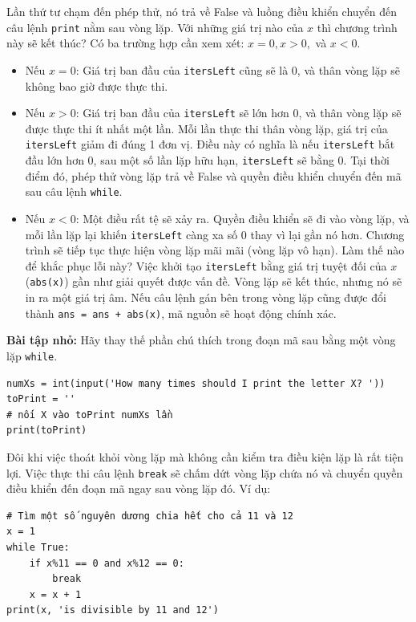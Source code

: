 Lần thứ tư chạm đến phép thử, nó trả về False và luồng điều khiển chuyển đến câu lệnh \texttt{print} nằm sau vòng lặp. Với những giá trị nào của $x$ thì chương trình này sẽ kết thúc? Có ba trường hợp cần xem xét: $x = 0, x > 0,$ và $x < 0$.

\begin{itemize}
    \item Nếu $x = 0$: Giá trị ban đầu của \texttt{itersLeft} cũng sẽ là 0, và thân vòng lặp sẽ không bao giờ được thực thi.
    
    \item Nếu $x > 0$: Giá trị ban đầu của \texttt{itersLeft} sẽ lớn hơn 0, và thân vòng lặp sẽ được thực thi ít nhất một lần. Mỗi lần thực thi thân vòng lặp, giá trị của \texttt{itersLeft} giảm đi đúng 1 đơn vị. Điều này có nghĩa là nếu \texttt{itersLeft} bắt đầu lớn hơn 0, sau một số lần lặp hữu hạn, \texttt{itersLeft} sẽ bằng 0. Tại thời điểm đó, phép thử vòng lặp trả về False và quyền điều khiển chuyển đến mã sau câu lệnh \texttt{while}.
    
    \item Nếu $x < 0$: Một điều rất tệ sẽ xảy ra. Quyền điều khiển sẽ đi vào vòng lặp, và mỗi lần lặp lại khiến \texttt{itersLeft} càng xa số 0 thay vì lại gần nó hơn. Chương trình sẽ tiếp tục thực hiện vòng lặp mãi mãi (vòng lặp vô hạn). Làm thế nào để khắc phục lỗi này? Việc khởi tạo \texttt{itersLeft} bằng giá trị tuyệt đối của $x$ (\texttt{abs(x)}) gần như giải quyết được vấn đề. Vòng lặp sẽ kết thúc, nhưng nó sẽ in ra một giá trị âm. Nếu câu lệnh gán bên trong vòng lặp cũng được đổi thành \texttt{ans = ans + abs(x)}, mã nguồn sẽ hoạt động chính xác.
\end{itemize}

\noindent \textbf{Bài tập nhỏ:} Hãy thay thế phần chú thích trong đoạn mã sau bằng một vòng lặp \texttt{while}.

\begin{verbatim}
numXs = int(input('How many times should I print the letter X? '))
toPrint = ''
# nối X vào toPrint numXs lần
print(toPrint)
\end{verbatim}

Đôi khi việc thoát khỏi vòng lặp mà không cần kiểm tra điều kiện lặp là rất tiện lợi. Việc thực thi câu lệnh \texttt{break} sẽ chấm dứt vòng lặp chứa nó và chuyển quyền điều khiển đến đoạn mã ngay sau vòng lặp đó. Ví dụ:

\begin{verbatim}
# Tìm một số nguyên dương chia hết cho cả 11 và 12
x = 1
while True:
    if x%11 == 0 and x%12 == 0:
        break
    x = x + 1
print(x, 'is divisible by 11 and 12')
\end{verbatim}

